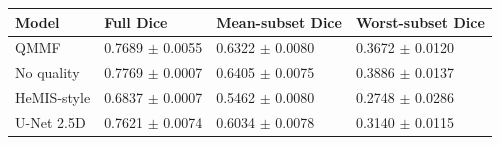 \begin{tabular}{llll}
\toprule
Model & Full Dice & Mean-subset Dice & Worst-subset Dice \\
\midrule
QMMF & 0.7689 $\pm$ 0.0055 & 0.6322 $\pm$ 0.0080 & 0.3672 $\pm$ 0.0120 \\
No quality & 0.7769 $\pm$ 0.0007 & 0.6405 $\pm$ 0.0075 & 0.3886 $\pm$ 0.0137 \\
HeMIS-style & 0.6837 $\pm$ 0.0007 & 0.5462 $\pm$ 0.0080 & 0.2748 $\pm$ 0.0286 \\
U-Net 2.5D & 0.7621 $\pm$ 0.0074 & 0.6034 $\pm$ 0.0078 & 0.3140 $\pm$ 0.0115 \\
\bottomrule
\end{tabular}
